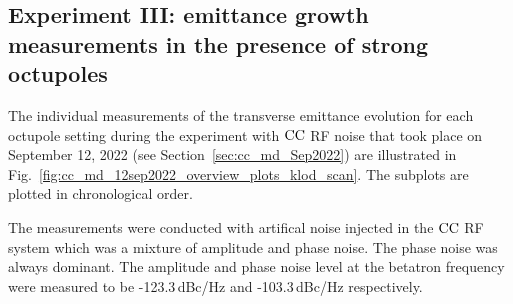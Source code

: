  \subsection{Experiment III: emittance growth measurements in the presence of strong octupoles}\label{subsec:emit_growth_cc_md_sep2022}
 The individual measurements of the transverse emittance evolution for each octupole setting during the experiment with ${\mathrm{CC}}$ RF noise that took place on September 12, 2022 (see Section~\ref{sec:cc_md_Sep2022}) are illustrated in Fig.~\ref{fig:cc_md_12sep2022_overview_plots_klod_scan}. The subplots are plotted in chronological order.
 
 The measurements were conducted with artifical noise injected in the ${\mathrm{CC}}$ RF system which was a mixture of amplitude and phase noise. The phase noise was always dominant. The amplitude and phase noise level at the betatron frequency were measured to be -123.3\,dBc/Hz and -103.3\,dBc/Hz respectively. %
 
